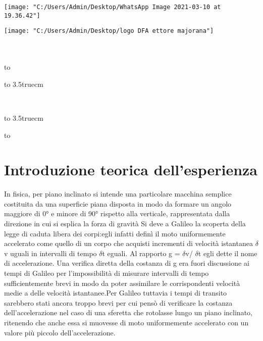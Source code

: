 \documentclass[a4paper, 12pt]{article} %
\begin{document}
	\begin{titlepage}
		\begin{center}
			\begin{minipage}[c]{0.45\textwidth}
				\begin{flushleft}
	\texttt{[image: "C:/Users/Admin/Desktop/WhatsApp Image 2021-03-10 at 19.36.42"]}
	
				\end{flushleft}
			\end{minipage}
			\hfill
			\begin{minipage}[c]{0.45\textwidth}
				\begin{flushright}
						\texttt{[image: "C:/Users/Admin/Desktop/logo DFA ettore majorana"]}
					
				\end{flushright}
			\end{minipage}\\
			\medskip
			{}\\
			\hbox to \textwidth{\hrulefill}
			\vspace{3truecm}
			{} %
			\vfill
			\uppercase{} %
			\vfill
			\centerline{\hbox to 3.5truecm{\hrulefill}}
			\medskip
			{}\\ %
			\centerline{\hbox to 3.5truecm{\hrulefill}}
			\vfill\vfill    %
			\hbox to \textwidth{\hrulefill}
			{} %
		\end{center}
	\end{titlepage}
	\clearpage	
\pagebreak
\tableofcontents	
\pagebreak
\section{Introduzione teorica dell'esperienza}
 In fisica, per piano inclinato si intende una particolare macchina semplice costituita da una superficie piana disposta in modo da formare un angolo maggiore di 0° e minore di 90° rispetto alla verticale, rappresentata dalla direzione in cui si esplica la forza di gravità
 Si deve a Galileo la scoperta della legge di caduta libera dei corpi:egli infatti definì il moto uniformemente accelerato come quello di un corpo che acquisti incrementi di velocità istantanea $\delta$v uguali in intervalli di tempo $\delta$t eguali. Al rapporto g = $\delta$v/ $\delta$t egli dette il nome di accelerazione.
 Una verifica diretta della costanza di g era fuori discussione ai tempi di Galileo per
 l’impossibilità di misurare intervalli di tempo sufficientemente brevi in modo da poter assimilare le corrispondenti velocità medie a delle velocità istantanee.Per Galileo tuttavia i tempi di transito sarebbero stati ancora troppo brevi per cui pensò di verificare la costanza dell’accelerazione nel caso di una sferetta che rotolasse lungo un piano inclinato, ritenendo che anche essa si muovesse di moto uniformemente accelerato con un valore più piccolo dell’accelerazione.
 
\end{document}
